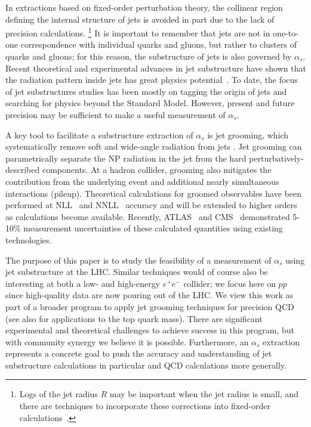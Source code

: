 In extractions based on fixed-order perturbation theory, the collinear region defining the internal
structure of jets is avoided in part due to the lack of precision calculations.%
\footnote{Logs of the jet radius $R$ may be important when the jet radius is small, and there are techniques to incorporate these corrections into fixed-order calculations~\cite{Dasgupta:2016bnd,Dasgupta:2014yra}.}
%
It is important to remember that jets are not in one-to-one correspondence with individual quarks and gluons, but rather to clusters of quarks and gluons; for this reason, the substructure of jets is also governed by $\alpha_s$.
%
Recent theoretical and experimental advances in jet substructure have shown that the radiation pattern inside jets has great physics potential~\cite{Abdesselam:2010pt,Altheimer:2012mn,Altheimer:2013yza,Adams:2015hiv,Larkoski:2017jix}.
%
To date, the focus of jet substructures studies has been mostly on tagging the origin of jets and searching for physics beyond the Standard Model.
%
However, present and future precision may be sufficient to make a useful measurement of $\alpha_s$.

A key tool to facilitate a substructure extraction of $\alpha_s$ is jet grooming, which systematically remove soft and wide-angle radiation from jets \cite{Butterworth:2008iy,Ellis:2009su,Ellis:2009me,Krohn:2009th,Dasgupta:2013ihk,Larkoski:2014wba}.
%
Jet grooming can parametrically separate the NP radiation in the jet from the hard perturbatively-described components.
%
At a hadron collider, grooming also mitigates the contribution from the underlying event and additional nearly simultaneous interactions (pileup).
%
Theoretical calculations for groomed observables have been performed at NLL~\cite{Marzani:2017kqd,Marzani:2017mva} and NNLL~\cite{Frye:2016aiz,Frye:2016okc} accuracy and will be extended to higher orders as calculations become available.
%
Recently, ATLAS~\cite{Aaboud:2017qwh} and CMS~\cite{CMS-PAS-SMP-16-010} demonstrated 5-10\% measurement uncertainties of these calculated quantities using existing technologies.

The purpose of this paper is to study the feasibility of a measurement of $\alpha_s$ using jet substructure at the LHC.
%
Similar techniques would of course also be interesting at both a low- and high-energy $e^+e^-$ collider; we focus here on $pp$ since high-quality data are now pouring out of the LHC.
%
We view this work as part of a broader program to apply jet grooming techniques for precision QCD (see also  for
applications to the top quark mass).
%
There are significant experimental and theoretical challenges to achieve success in this program, but with community synergy we believe it is possible.
%
Furthermore, an $\alpha_s$ extraction represents a concrete goal to push the accuracy and understanding of jet substructure calculations in particular and QCD calculations more generally.

